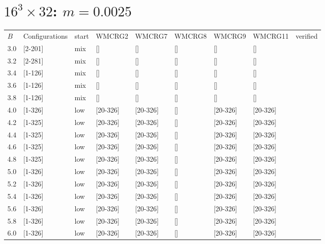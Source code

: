\documentclass{article}
\begin{document}
  \section{$16^3\times32$:  $m=0.0025$}
    \begin{tabular}{ l | l | l | l | l }
      \hline
      $B$ & Configurations & start & WMCRG2 & WMCRG7 & WMCRG8 & WMCRG9 & WMCRG11 & verified\\
      3.0 & [2-201] & mix & [] & [] & [] & [] & [] &\\
      3.2 & [2-281] & mix & [] & [] & [] & [] & [] &\\
      3.4 & [1-126] & mix & [] & [] & [] & [] & [] &\\
      3.6 & [1-126] & mix & [] & [] & [] & [] & [] &\\
      3.8 & [1-126] & mix & [] & [] & [] & [] & [] &\\
      4.0 & [1-326] & low & [20-326] & [20-326] & [] & [20-326] & [20-326] &\\
      4.2 & [1-325] & low & [20-326] & [20-326] & [] & [20-326] & [20-326] &\\
      4.4 & [1-325] & low & [20-326] & [20-326] & [] & [20-326] & [20-326] &\\
      4.6 & [1-325] & low & [20-326] & [20-326] & [] & [20-326] & [20-326] &\\
      4.8 & [1-325] & low & [20-326] & [20-326] & [] & [20-326] & [20-326] &\\
      5.0 & [1-326] & low & [20-326] & [20-326] & [] & [20-326] & [20-326] &\\
      5.2 & [1-326] & low & [20-326] & [20-326] & [] & [20-326] & [20-326] &\\
      5.4 & [1-326] & low & [20-326] & [20-326] & [] & [20-326] & [20-326] &\\
      5.6 & [1-326] & low & [20-326] & [20-326] & [] & [20-326] & [20-326] &\\
      5.8 & [1-326] & low & [20-326] & [20-326] & [] & [20-326] & [20-326] &\\
      6.0 & [1-326] & low & [20-326] & [20-326] & [] & [20-326] & [20-326] &\\
      \hline
    \end{tabular}
\end{document}
